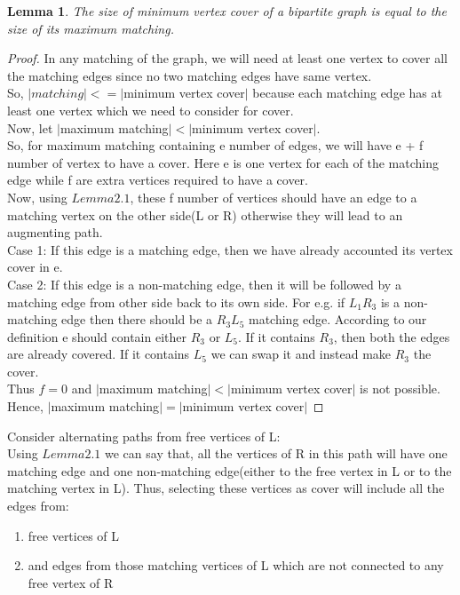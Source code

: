 \documentclass[11pt]{article}
\newtheorem{lemma}[theorem]{Lemma}
\begin{document}
\begin{lemma}
	The size of minimum vertex cover of a bipartite graph is equal to the size of its maximum matching.
\end{lemma} 
\begin{proof}
	In any matching of the graph, we will need at least one vertex to cover all the matching edges since no two matching edges
	have same vertex. \\
	So, $|matching| <= |$minimum vertex cover$|$ because each matching edge has at least one vertex which we need to consider for
	cover. \\
	Now, let $|$maximum matching$| < |$minimum vertex cover$|$. \\
	So, for maximum matching containing e number of edges, we will have e + f number of vertex to have a cover. Here e is one vertex 
	for each of the matching edge while f are extra vertices required to have a cover. \\ 
	Now, using $Lemma 2.1$, these f number of vertices should have an edge to a matching vertex on the other side(L or R) otherwise 
	they will lead to an augmenting path. \\
	Case 1: If this edge is a matching edge, then we have already accounted its vertex cover in e.\\
	Case 2: If this edge is a non-matching edge, then it will be followed by a matching edge from other side back to its own side.
	For e.g.  if $L_1 R_3$ is a non-matching edge then there should be a $R_3 L_5$ matching edge. According to our definition
	e should contain either $R_3$ or $L_5$. If it contains $R_3$, then both the edges are already covered. If it contains $L_5$
	we can swap it and instead make $R_3$ the cover. \\
	Thus $f = 0$ and  $|$maximum matching$| < |$minimum vertex cover$|$ is not possible. \\
	Hence, $|$maximum matching$| = |$minimum vertex cover$|$	
\end{proof}
Consider alternating paths from free vertices of L: \\
Using $Lemma 2.1$ we can say that, all the vertices of R in this path will have one matching edge and one non-matching edge(either to 
the free vertex in L or to the matching vertex in L). Thus, selecting these vertices as cover will include all the edges from: \\
\begin{enumerate}
	\item free vertices of L
	\item and edges from those matching vertices of L which are not connected to any free vertex of R
\end{enumerate}
\end{document}
